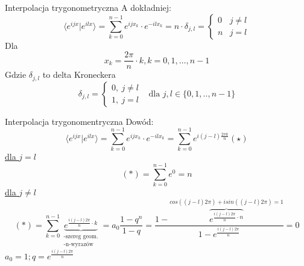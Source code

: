 		\begin{frame}{Interpolacja trygonometryczna}
		A dokładniej:
		\[
			\langle e^{ijx}|e^{ilx} \rangle = \sum\limits_{k = 0}^{n - 1}e^{ijx_k}  \cdot e^{-ilx_k} = n \cdot \delta_{j,l}=
			\begin{cases}
				0 & j \neq l \\
				n & j = l
			\end{cases}
		\]
		Dla
		$$
		x_k = \frac{2\pi}{n} \cdot k, k = 0, 1, \dots, n-1
		$$
		Gdzie $\delta_{j,l}$ to delta Kroneckera
		$$
		\delta_{j,l}=\left\{\begin{array}
		{l} 0,\ j\neq l\ \ \\
		1,\ j=l\ 
        \end{array}\right. 
        \text{ dla $j,l \in \{0,1,..,n-1\}$} $$

\end{frame}
\begin{frame}{Interpolacja trygonomentryczna}
Dowód:
		\[
			\langle e^{ijx}|e^{ilx} \rangle = \sum\limits_{k = 0}^{n-1} e^{ijx_k}  \cdot e^{-ilx_k} = \sum\limits_{k = 0}^{n-1} e^{i(j - l) \frac{2\pi k}{n}}(\star)
		\]
		\underline{dla $j = l$}
		\[
			(*)= \sum\limits_{k = 0}^{n-1} e^0 = n
		\]
		\underline{dla $j \neq l$}
		\[
		(*)= \sum\limits_{k = 0}^{n-1} \underbrace{e^{\frac{i(j - l)2\pi}{n} \cdot k}}_{\substack{
				\text{-szereg geom.} \\
				\text{-n-wyrazów}
			}} = a_0\frac{1 - q^n}{1 - q} = \frac{1 - \overbrace{e^{\frac{i(j - l)2\pi}{n} \cdot n}}^{cos((j - l)2\pi)+isin((j - l)2\pi)=1}}{1 - e^{\frac{i(j -  l)2\pi}{n}}} = 0
		\]
		$a_0 = 1; q = e^{\frac{i(j -  l)2\pi}{n}}$
\end{frame}

